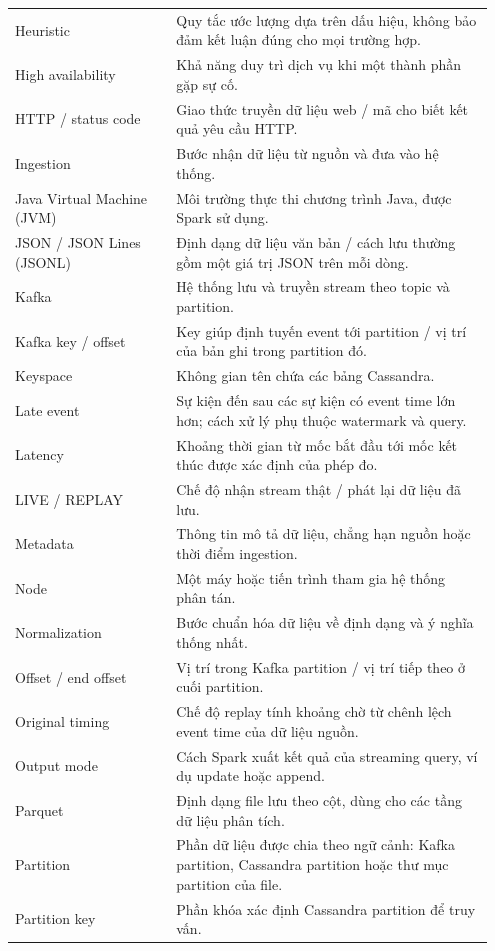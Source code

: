 \begin{longtable}{@{}p{0.32\linewidth}p{0.63\linewidth}@{}}
Heuristic & Quy tắc ước lượng dựa trên dấu hiệu, không bảo đảm kết luận đúng cho mọi trường hợp. \\
High availability & Khả năng duy trì dịch vụ khi một thành phần gặp sự cố. \\
HTTP / status code & Giao thức truyền dữ liệu web / mã cho biết kết quả yêu cầu HTTP. \\
Ingestion & Bước nhận dữ liệu từ nguồn và đưa vào hệ thống. \\
Java Virtual Machine (JVM) & Môi trường thực thi chương trình Java, được Spark sử dụng. \\
JSON / JSON Lines (JSONL) & Định dạng dữ liệu văn bản / cách lưu thường gồm một giá trị JSON trên mỗi dòng. \\
Kafka & Hệ thống lưu và truyền stream theo topic và partition. \\
Kafka key / offset & Key giúp định tuyến event tới partition / vị trí của bản ghi trong partition đó. \\
Keyspace & Không gian tên chứa các bảng Cassandra. \\
Late event & Sự kiện đến sau các sự kiện có event time lớn hơn; cách xử lý phụ thuộc watermark và query. \\
Latency & Khoảng thời gian từ mốc bắt đầu tới mốc kết thúc được xác định của phép đo. \\
LIVE / REPLAY & Chế độ nhận stream thật / phát lại dữ liệu đã lưu. \\
Metadata & Thông tin mô tả dữ liệu, chẳng hạn nguồn hoặc thời điểm ingestion. \\
Node & Một máy hoặc tiến trình tham gia hệ thống phân tán. \\
Normalization & Bước chuẩn hóa dữ liệu về định dạng và ý nghĩa thống nhất. \\
Offset / end offset & Vị trí trong Kafka partition / vị trí tiếp theo ở cuối partition. \\
Original timing & Chế độ replay tính khoảng chờ từ chênh lệch event time của dữ liệu nguồn. \\
Output mode & Cách Spark xuất kết quả của streaming query, ví dụ update hoặc append. \\
Parquet & Định dạng file lưu theo cột, dùng cho các tầng dữ liệu phân tích. \\
Partition & Phần dữ liệu được chia theo ngữ cảnh: Kafka partition, Cassandra partition hoặc thư mục partition của file. \\
Partition key & Phần khóa xác định Cassandra partition để truy vấn. \\

\end{longtable}
